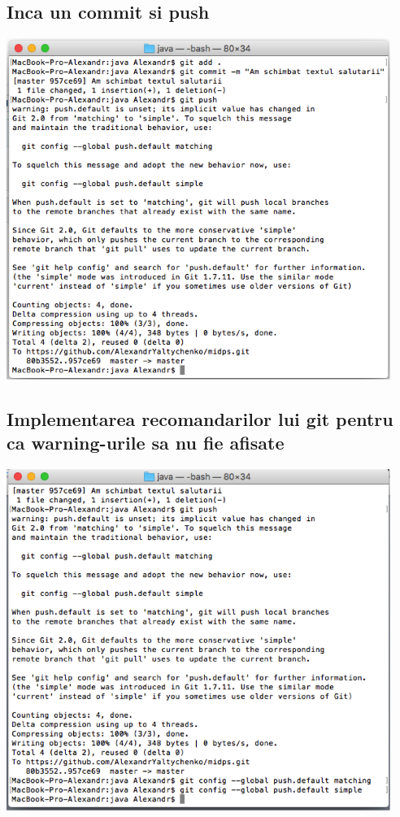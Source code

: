 \documentclass[12pt]{article}
\begin{document}
\subsection{Inca un commit si push}
\includegraphics[width=12.5cm]{images/15}
\subsection{Implementarea recomandarilor lui git pentru ca warning-urile sa nu fie afisate}
\includegraphics[width=12.5cm]{images/16}
\end{document}
